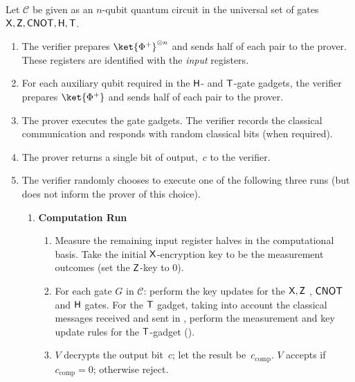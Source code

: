 \documentclass{toc}
\newcommand{\hgate}{{\sf H}}
\newcommand{\rgate}{{\sf T}}
\newcommand{\tgate}{{\sf T}}
\newcommand{\xgate}{{\sf X}}
\newcommand{\zgate}{{\sf Z}}
\newcommand{\cnot}{{\sf CNOT}}
\newcommand{\cC}{\mathcal{C}}
\begin{document}
\begin{proof-system} \caption{\label{prot:interactive-proof-EPR} Verifiable quantum computation with trusted auxiliary states- EPR version}
Let $\mathcal{C}$ be given as an $n$-qubit quantum circuit in the universal 
set of gates
%
%
 $\xgate, \zgate, \cnot, \hgate, \rgate$.
\begin{enumerate}
\item The verifier prepares $\ket{\Phi^+}^{\otimes n}$ and sends  half of each pair to the prover. These registers are identified with the \emph{input} registers.
\item \label{step:gates-EPR-protocol} For each auxiliary qubit required in the $\hgate$- and $\rgate$-gate gadgets, the verifier prepares  $\ket{\Phi^+}$ and sends half of each pair to the prover.
\item The prover executes the gate gadgets. The verifier records the classical communication and responds with random classical bits (when required).\label{step:gates-EPR-protocol-execute}
\item The prover returns a single bit of output,~$c$ to the verifier.
\item The verifier randomly chooses to execute one of the following three runs (but does not inform the prover of this choice).

\begin{enumerate}[label=\Alph*.]
\item   \textbf{Computation Run}
\begin{enumerate}[label*=\arabic*.]
\item \label{step:input-EPR-Computation}Measure the remaining input register halves in the computational basis. Take the initial $\xgate$-encryption key to be the measurement outcomes (set the $\zgate$-key to 0).
\item For each gate $G$ in  $\cC$:  perform the key updates for the $\xgate, \zgate$ , $\cnot$ and $\hgate$ gates. For the $\rgate$ gadget, taking into account the classical messages received and sent in , perform the measurement and key update rules for the $\tgate$-gadget ().
\item $V$ decrypts the output bit~$c$; let the result be~$c_{\text{comp}}$. $V$ accepts if~$c_{\text{comp}}=0$; otherwise reject.
\end{enumerate}


\end{enumerate}
\end{enumerate}
\end{proof-system}
\end{document}
